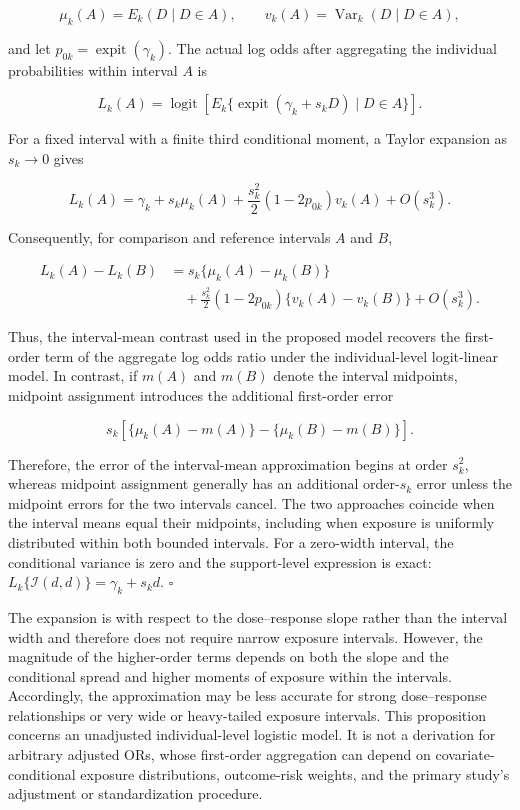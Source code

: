 \documentclass[journal=rsm]{CUP-JNL-DTM}%
\theoremstyle{definition}
\numberwithin{equation}{section}
\begin{document}
\[
\mu_k(A)=E_k(D\mid D\in A),
\qquad
v_k(A)=\operatorname{Var}_k(D\mid D\in A),
\]

and let $p_{0k}=\operatorname{expit}(\gamma_k)$. The actual log odds after
aggregating the individual probabilities within interval $A$ is

\[
L_k(A)
=
\operatorname{logit}
\left[
E_k\{
\operatorname{expit}(\gamma_k+s_kD)
\mid D\in A
\}
\right].
\]

For a fixed interval with a finite third conditional moment, a Taylor
expansion as $s_k\rightarrow0$ gives

\[
L_k(A)
=
\gamma_k+s_k\mu_k(A)
+
\frac{s_k^2}{2}
(1-2p_{0k})v_k(A)
+
O(s_k^3).
\]

Consequently, for comparison and reference intervals $A$ and $B$,

\[
\begin{aligned}
L_k(A)-L_k(B)
&=
s_k\{\mu_k(A)-\mu_k(B)\} \\
&\quad+
\frac{s_k^2}{2}(1-2p_{0k})
\{v_k(A)-v_k(B)\}
+
O(s_k^3).
\end{aligned}
\]

Thus, the interval-mean contrast used in the proposed model recovers the
first-order term of the aggregate log odds ratio under the individual-level
logit-linear model. In contrast, if $m(A)$ and $m(B)$ denote the interval
midpoints, midpoint assignment introduces the additional first-order error

\[
s_k
\left[
\{\mu_k(A)-m(A)\}
-
\{\mu_k(B)-m(B)\}
\right].
\]

Therefore, the error of the interval-mean approximation begins at order
$s_k^2$, whereas midpoint assignment generally has an additional order-$s_k$
error unless the midpoint errors for the two intervals cancel. The two
approaches coincide when the interval means equal their midpoints, including
when exposure is uniformly distributed within both bounded intervals.
For a zero-width interval, the conditional variance is zero and the
support-level expression is exact: $L_k\{\mathcal I(d,d)\}=\gamma_k+s_kd$.
\hfill$\square$

The expansion is with respect to the dose--response slope rather than the
interval width and therefore does not require narrow exposure intervals.
However, the magnitude of the higher-order terms depends on both the slope
and the conditional spread and higher moments of exposure within the
intervals. Accordingly, the approximation may be less accurate for strong
dose--response relationships or very wide or heavy-tailed exposure intervals.
This proposition concerns an unadjusted individual-level logistic model. It is
not a derivation for arbitrary adjusted ORs, whose first-order aggregation can
depend on covariate-conditional exposure distributions, outcome-risk weights,
and the primary study's adjustment or standardization procedure.
\end{document}
